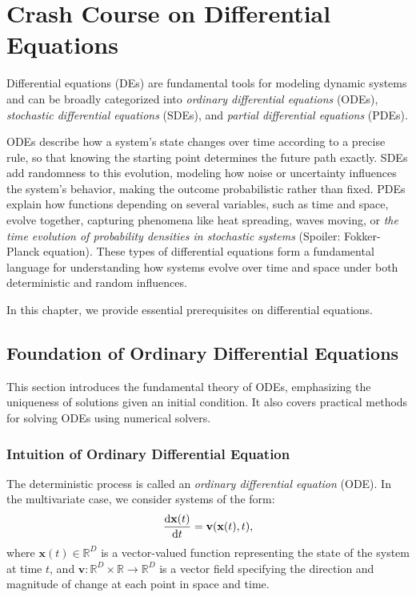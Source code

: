 \chapter{Crash Course on Differential Equations}\label{app:de}

Differential equations (DEs) are fundamental tools for modeling dynamic systems and can be broadly categorized into \emph{ordinary differential equations} (ODEs), \emph{stochastic differential equations} (SDEs), and \emph{partial differential equations} (PDEs). 

ODEs describe how a system’s state changes over time according to a precise rule, so that knowing the starting point determines the future path exactly. SDEs add randomness to this evolution, modeling how noise or uncertainty influences the system’s behavior, making the outcome probabilistic rather than fixed. PDEs explain how functions depending on several variables, such as time and space, evolve together, capturing phenomena like heat spreading, waves moving, or \emph{the time evolution of probability densities in stochastic systems} (Spoiler: Fokker-Planck equation). These types of differential equations form a fundamental language for understanding how systems evolve over time and space under both deterministic and random influences.

In this chapter, we provide essential prerequisites on differential equations.

\clearpage
\newpage

\section{Foundation of Ordinary Differential Equations}

This section introduces the fundamental theory of ODEs, emphasizing the uniqueness of solutions given an initial condition. It also covers practical methods for solving ODEs using numerical solvers.


\subsection{Intuition of Ordinary Differential Equation}

The deterministic process is called an \emph{ordinary differential equation} (ODE). In the multivariate case, we consider systems of the form:
\begin{equation}\label{eq:general_ode}
    \frac{\mathop{}\!\mathrm{d} \mathbf{x}(t)}{\mathop{}\!\mathrm{d} t} = \mathbf{v}(\mathbf{x}(t), t),
\end{equation}
where $\mathbf{x}(t) \in \mathbb{R}^D$ is a vector-valued function representing the state of the system at time $t$, and $\mathbf{v}: \mathbb{R}^D \times \mathbb{R} \to \mathbb{R}^D$ is a vector field specifying the direction and magnitude of change at each point in space and time.



